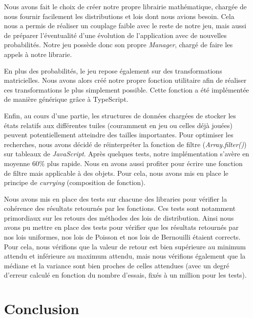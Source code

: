 \documentclass[a4paper, 12pt]{report}
\begin{document}
\tabto{1cm}Nous avons fait le choix de créer notre propre librairie mathématique, chargée de nous fournir facilement les distributions et lois
dont nous avions besoin. Cela nous a permis de réaliser un couplage faible avec le reste de notre jeu, mais aussi de préparer
l'éventualité d'une évolution de l'application avec de nouvelles probabilités. Notre jeu possède donc son propre \textit{Manager}, chargé 
de faire les appels à notre librarie.

\vspace{0.5cm}

\tabto{1cm}En plus des probabilités, le jeu repose également sur des transformations
matricielles. Nous avons alors créé notre propre fonction utilitaire afin de réaliser ces transformations le plus
simplement possible. Cette fonction a été implémentée de manière générique grâce à TypeScript.

\vspace{0.5cm}

\tabto{1cm}Enfin, au cours d'une partie, les structures de données chargées de stocker les états relatifs aux différentes tuiles
(couramment en jeu ou celles déjà jouées) peuvent potentiellement atteindre des tailles importantes. Pour optimiser les recherches, 
nous avons décidé de réinterpréter la fonction de filtre (\textit{Array.filter()}) sur tableaux de \textit{JavaScript}.
Après quelques tests, notre implémentation s'avère en moyenne 60\% plus rapide. Nous en avons aussi profiter pour écrire une fonction
de filtre mais applicable à des objets. Pour cela, nous avons mis en place le principe de \textit{currying} (composition de fonction).

\vspace{0.5cm}

\tabto{1cm}Nous avons mis en place des tests sur chacune des libraries pour vérifier la cohérence des résultats retournés par les fonctions.
Ces tests sont notamment primordiaux sur les retours des méthodes des lois de distribution. Ainsi nous avons pu mettre en place des tests pour
vérifier que les résultats retournés par nos lois uniformes, nos lois de Poisson et nos lois de Bernouilli étaient corrects. Pour cela, nous
vérifions que la valeur de retour est bien supérieure au minimum attendu et inférieure au maximum attendu, mais nous vérifions également que la 
médiane et la variance sont bien proches de celles attendues (avec un degré d'erreur calculé en fonction du nombre d'essais, fixés à un million pour les tests).

\chapter{Conclusion}
\end{document}
